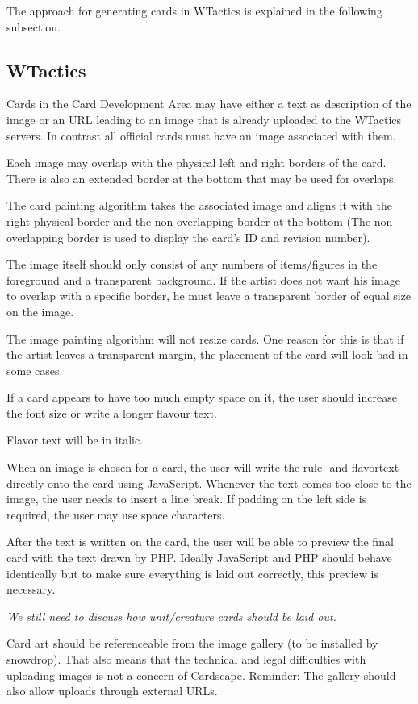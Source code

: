 \documentclass[a4paper, 11pt]{scrbook}
\begin{document}
The approach for generating cards in WTactics is explained in the following subsection.

\subsection{WTactics}
Cards in the Card Development Area may have either a text as description of the image or an URL leading to an image that is already uploaded to the WTactics servers. In contrast all official cards must have an image associated with them.

Each image may overlap with the physical left and right borders of the card. There is also an extended border at the bottom that may be used for overlaps.

The card painting algorithm takes the associated image and aligns it with the right physical border and  the non-overlapping border at the bottom (The non-overlapping border is used to display the card's ID and revision number).

The image itself should only consist of any numbers of items/figures in the foreground and a transparent background. If the artist does not want his image to overlap with a specific border, he must leave a transparent border of equal size on the image.

The image painting algorithm will not resize cards. One reason for this is that if the artist leaves a transparent margin, the placement of the card will look bad in some cases.

If a card appears to have too much empty space on it, the user should increase the font size or write a longer flavour text.

Flavor text will be in italic.

When an image is chosen for a card, the user will write the rule- and flavortext directly onto the card using JavaScript. Whenever the text comes too close to the image, the user needs to insert a line break. If padding on the left side is required, the user may use space characters.

After the text is written on the card, the user will be able to preview the final card with the text drawn by PHP. Ideally JavaScript and PHP should behave identically but to make sure everything is laid out correctly, this preview is necessary.

\emph{We still need to discuss how unit/creature cards should be laid out.}

Card art should be referenceable from the image gallery (to be installed by snowdrop). That also means that the technical and legal difficulties with uploading images is not a concern of Cardscape. Reminder: The gallery should also allow uploads through external URLs.
\end{document}

